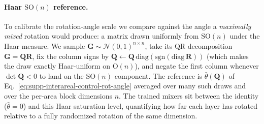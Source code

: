 \paragraph{Haar $\mathrm{SO}(n)$ reference.} To calibrate the rotation-angle scale we compare against the angle a \emph{maximally mixed} rotation would produce: a matrix drawn uniformly from $\mathrm{SO}(n)$ under the Haar measure. We sample $\mathbf{G}\sim\mathcal{N}(0,1)^{n\times n}$, take its QR decomposition $\mathbf{G}=\mathbf{Q}\mathbf{R}$, fix the column signs by $\mathbf{Q}\leftarrow\mathbf{Q}\,\mathrm{diag}(\mathrm{sgn}(\mathrm{diag}\,\mathbf{R}))$ (which makes the draw exactly Haar-uniform on $\mathrm{O}(n)$), and negate the first column whenever $\det\mathbf{Q}<0$ to land on the $\mathrm{SO}(n)$ component. The reference is $\bar\theta(\mathbf{Q})$ of Eq.~\ref{eq:supp-interareal-control-rot-angle} averaged over many such draws and over the per-area block dimensions $n$. The trained mixers sit between the identity ($\bar\theta=0$) and this Haar saturation level, quantifying how far each layer has rotated relative to a fully randomized rotation of the same dimension.


